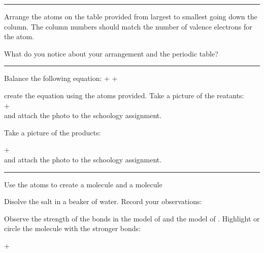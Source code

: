 \documentclass[12pt]{exam}
\begin{document}
\noindent\rule{\textwidth}{1pt}

Arrange the atoms on the table provided from largest to smallest going down the column. The column numbers should match the number of valence electrons for the atom.

\begin{questions}
  \question What do you notice about your arrangement and the periodic table?

  \vspace{4cm}

\end{questions}

\noindent\rule{\textwidth}{1pt}
\begin{questions}
 \question Balance the following equation: 
 \vspace{1cm}
  + \fillin[2][.5cm] \ce{->}   + \fillin[2][.5cm]

 \question create the equation using the atoms provided. Take a picture of the reatants:\\
  + \fillin[2][.5cm]\\ and attach the photo to the schoology assignment.

 \vspace{1cm}

 Take a picture of the products:

  + \fillin[2][.5cm] \\ and attach the photo to the schoology assignment.
\end{questions}

\noindent\rule{\textwidth}{1pt}

Use the atoms to create a  molecule and a  molecule

\begin{questions}
  \question Disolve the salt in a beaker of water. Record your observations:

  \vspace{2cm}

  \question Observe the strength of the bonds in the model of  and the model of . Highlight or circle the molecule with the stronger bonds:

   + 
\end{questions}
\end{document}
